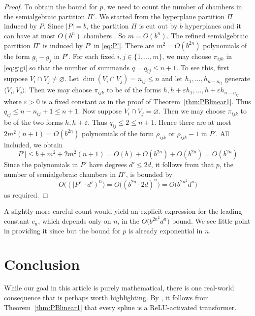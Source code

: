 \documentclass[11pt]{amsart}
\theoremstyle{plain}
\theoremstyle{definition}
\begin{document}
\begin{proof}
To obtain the bound for $p$, we need to count the number of chambers in the semialgebraic partition $\Pi'$. We started from the hyperplane partition $\Pi$ induced by $P$. Since $\lvert P \rvert = b$, the partition $\Pi$ is cut out by $b$ hyperplanes and it can have at most $O(b^n)$ chambers \cite[Chapter~6]{GTM212}. So $m = O(b^n)$. The refined semialgebraic partition $\Pi'$ is induced by $P'$ in \eqref{eq:P'}. There are $m^2 = O(b^{2n})$ polynomials of the form $g_i - g_j$ in $P'$. For each fixed $i, j \in \{1,\dots,m\}$, we may choose $\pi_{ijk}$ in \eqref{eq:gigi}  so that the number of summands $q = q_{ij} \le n+1$. To see this, first suppose $V_i\cap V_j \ne \varnothing$. Let $\dim(V_i\cap V_j) = n_{ij} \le n$ and let $h_1, \dots, h_{n - n_{ij}}$ generate $\langle V_i, V_j \rangle$. Then we may choose $\pi_{ijk}$ to be of the forms $h, h + \varepsilon h_1, \dots, h + \varepsilon h_{n - n_{ij}}$ where $\varepsilon > 0$ is a fixed constant as in the proof of Theorem~\ref{thm:PBlinear1}. Thus $q_{ij} \le n - n_{ij} + 1 \le n+1$. Now suppose $V_i\cap V_j = \varnothing$. Then we may choose $\pi_{ijk}$  to be of the two forms $h, h + \varepsilon$. Thus $q_{ij} \le 2 \le n+1$. Hence there are at most $2m^2 (n+1) = O(b^{2n})$ polynomials of the form $\rho_{ijk}$ or $\rho_{ijk}-1$ in $P'$. All included, we obtain
\[
\lvert P' \rvert \le b + m^2 + 2m^2(n + 1) = O(b) + O(b^{2n}) + O(b^{2n}) = O(b^{2n}).
\]
Since the polynomials in $P'$ have degrees $d' \le 2d$, it follows from \cite[Chapter~7]{basu2003} that $p$, the number of semialgebraic chambers in $\Pi'$, is bounded by
\[
O\bigl((\lvert P'\rvert \cdot d')^n \bigr) = O\bigl((b^{2n} \cdot 2d)^n\bigr) = O\bigl(b^{2n^2}d^n \bigr)
\]
as required.
\end{proof}
A slightly more careful count would yield an explicit expression for the leading constant $c_n$, which depends only on $n$, in the $O\bigl(b^{2n^2}d^n \bigr)$ bound. We see little point in providing it since but the bound for $p$ is already exponential in $n$.

\section{Conclusion}

While our goal in this article is purely mathematical, there is one real-world consequence that is perhaps worth highlighting. By \cite[Theorem~3.8]{lai2024}, it follows from Theorem~\ref{thm:PBlinear1} that every spline is a ReLU-activated transformer.
\end{document}
